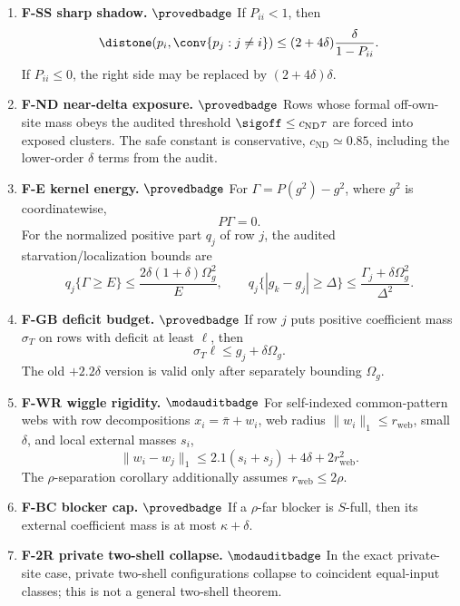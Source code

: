 \begin{enumerate}[leftmargin=*,itemsep=0.5ex]
\item \textbf{F-SS sharp shadow.} \(\provedbadge\)
If \(P_{ii}<1\), then
\[
 \distone(p_i,\conv\{p_j:j\ne i\})
       \le (2+4\delta)\frac{\delta}{1-P_{ii}} .
\]
If \(P_{ii}\le 0\), the right side may be replaced by \((2+4\delta)\delta\).

\item \textbf{F-ND near-delta exposure.} \(\provedbadge\)
Rows whose formal off-own-site mass obeys the audited threshold
\(\sigoff\le c_{\mathrm{ND}}\tau\) are forced into exposed clusters.  The
safe constant is conservative, \(c_{\mathrm{ND}}\simeq0.85\), including the
lower-order \(\delta\) terms from the audit.

\item \textbf{F-E kernel energy.} \(\provedbadge\)
For \(\Gamma=P(g^2)-g^2\), where \(g^2\) is coordinatewise,
\[
        P\Gamma=0 .
\]
For the normalized positive part \(q_j\) of row \(j\), the audited
starvation/localization bounds are
\[
q_j\{\Gamma\ge E\}\le \frac{2\delta(1+\delta)\Omega_g^2}{E},
\qquad
q_j\{|g_k-g_j|\ge\Delta\}\le\frac{\Gamma_j+\delta\Omega_g^2}{\Delta^2}.
\]

\item \textbf{F-GB deficit budget.} \(\provedbadge\)
If row \(j\) puts positive coefficient mass \(\sigma_T\) on rows with
deficit at least \(\ell\), then
\[
        \sigma_T\ell\le g_j+\delta\Omega_g .
\]
The old \(+2.2\delta\) version is valid only after separately bounding
\(\Omega_g\).

\item \textbf{F-WR wiggle rigidity.} \(\modauditbadge\)
For self-indexed common-pattern webs with row decompositions
\(x_i=\bar\pi+w_i\), web radius \(\|w_i\|_1\le r_{\mathrm{web}}\), small
\(\delta\), and local external masses \(s_i\),
\[
 \|w_i-w_j\|_1\le 2.1(s_i+s_j)+4\delta+2r_{\mathrm{web}}^2 .
\]
The \(\rho\)-separation corollary additionally assumes
\(r_{\mathrm{web}}\le 2\rho\).

\item \textbf{F-BC blocker cap.} \(\provedbadge\)
If a \(\rho\)-far blocker is \(S\)-full, then its external coefficient
mass is at most \(\kappa+\delta\).

\item \textbf{F-2R private two-shell collapse.} \(\modauditbadge\)
In the exact private-site case, private two-shell configurations collapse
to coincident equal-input classes; this is not a general two-shell theorem.
\end{enumerate}

